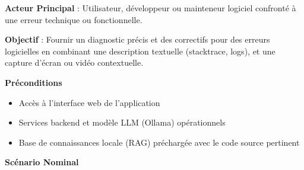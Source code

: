 \documentclass[12pt,a4paper]{report}
\begin{document}
	\textbf{Acteur Principal} : Utilisateur, développeur ou mainteneur logiciel confronté à une erreur technique ou fonctionnelle.	
	
	\textbf{Objectif} : Fournir un diagnostic précis et des correctifs pour des erreurs logicielles en combinant une description textuelle (stacktrace, logs), et une capture d'écran ou vidéo contextuelle.
	
	\textbf{Préconditions}
	
	\begin{itemize}
		\item Accès à l'interface web de l'application
		\item Services backend et modèle LLM (Ollama) opérationnels
		\item Base de connaissances locale (RAG) préchargée avec le code source pertinent
	\end{itemize}
	
	\textbf{Scénario Nominal}
	
\end{document}
